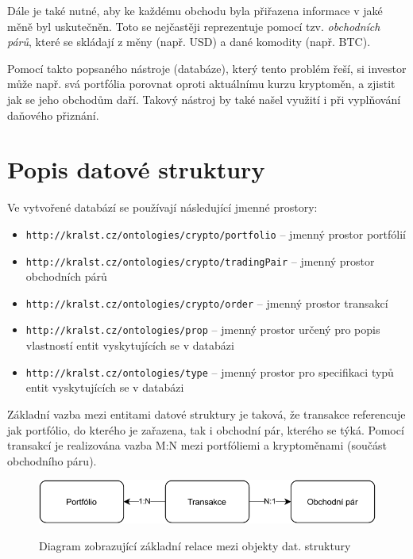 \documentclass[12pt, a4paper]{article}
\let\oldsection\section
\renewcommand\section{\clearpage\oldsection}
\begin{document}
Dále je také nutné, aby ke každému obchodu byla přiřazena informace v jaké měně byl uskutečněn. Toto se nejčastěji reprezentuje pomocí tzv. \textit{obchodních párů}, které se skládají z měny (např. USD) a dané komodity (např. BTC).

Pomocí takto popsaného nástroje (databáze), který tento problém řeší, si investor může např. svá portfólia porovnat oproti aktuálnímu kurzu kryptoměn, a zjistit jak se jeho obchodům daří. Takový nástroj by také našel využití i při vyplňování daňového přiznání.

\section{Popis datové struktury}

Ve vytvořené databází se používají následující jmenné prostory:

\begin{itemize}
    \item \texttt{http://kralst.cz/ontologies/crypto/portfolio} -- jmenný prostor portfólií
    \item \texttt{http://kralst.cz/ontologies/crypto/tradingPair} -- jmenný prostor obchodních párů
    \item \texttt{http://kralst.cz/ontologies/crypto/order} -- jmenný prostor transakcí
    \item \texttt{http://kralst.cz/ontologies/prop} -- jmenný prostor určený pro popis vlastností entit vyskytujících se v databázi
    \item \texttt{http://kralst.cz/ontologies/type} -- jmenný prostor pro specifikaci typů entit vyskytujících se v databázi
\end{itemize}

Základní vazba mezi entitami datové struktury je taková, že transakce referencuje jak portfólio, do kterého je zařazena, tak i obchodní pár, kterého se týká. Pomocí transakcí je realizována vazba M:N mezi portfóliemi a kryptoměnami (součást obchodního páru).

\begin{figure}[!ht]
\centering
{\includegraphics[width=13.5cm]{img/diagram.pdf}}
\caption{Diagram zobrazující základní relace mezi objekty dat. struktury}
\label{fig:screen-transition-diagram}
\end{figure}
\end{document}
